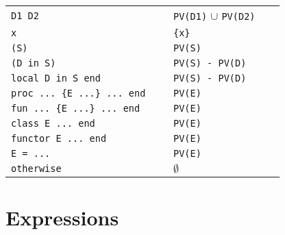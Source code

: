\documentclass[a4paper]{memoir}
\begin{document}
\begin{appendices}
\begin{tabular} {l l}
\lstinline!D1 D2                      ! & \lstinline!PV(D1)! $\cup$ \lstinline!PV(D2)! \\
\lstinline!x                          ! & \lstinline!{x}!                  \\
\lstinline!(S)                        ! & \lstinline!PV(S)             ! \\
\lstinline!(D in S)                   ! & \lstinline!PV(S) - PV(D)     ! \\
\lstinline!local D in S end           ! & \lstinline!PV(S) - PV(D)     ! \\
\lstinline!proc ... {E ...} ... end   ! & \lstinline!PV(E)             ! \\
\lstinline!fun ... {E ...} ... end    ! & \lstinline!PV(E)             ! \\
\lstinline!class E ... end            ! & \lstinline!PV(E)             ! \\
\lstinline!functor E ... end          ! & \lstinline!PV(E)             ! \\
\lstinline!E = ...                    ! & \lstinline!PV(E)             ! \\
\lstinline!otherwise                  ! & $\emptyset$          \\
\end{tabular}



\section{Expressions}


\end{appendices}
\end{document}
